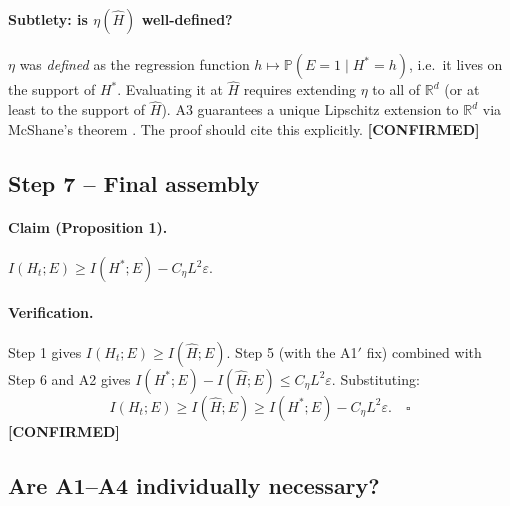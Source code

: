 \documentclass[11pt]{article}
\newcommand{\R}{\mathbb{R}}
\newcommand{\PP}{\mathbb{P}}
\newcommand{\CONF}{{\color{black!60!green}\textbf{[CONFIRMED]}}}
\begin{document}
\paragraph{Subtlety: is $\eta(\hat H)$ well-defined?}
$\eta$ was \emph{defined} as the regression function $h\mapsto\PP(E=1\mid
H^*=h)$, i.e.\ it lives on the support of $H^*$. Evaluating it at $\hat H$
requires extending $\eta$ to all of $\R^d$ (or at least to the support
of $\hat H$). A3 guarantees a unique Lipschitz extension to $\R^d$ via
McShane's theorem \citep{McShane1934}. The proof should cite this
explicitly. \CONF

\subsection{Step 7 -- Final assembly}

\paragraph{Claim (Proposition 1).}
$I(H_t;E)\ge I(H^*;E) - C_\eta L^2\varepsilon$.

\paragraph{Verification.}
Step 1 gives $I(H_t;E)\ge I(\hat H;E)$. Step 5 (with the A1$'$ fix)
combined with Step 6 and A2 gives
$I(H^*;E)-I(\hat H;E)\le C_\eta L^2\varepsilon$. Substituting:
\[
I(H_t;E)\ge I(\hat H;E)\ge I(H^*;E)-C_\eta L^2\varepsilon. \quad\square
\]
\CONF

\subsection{Are A1--A4 individually necessary?}
\end{document}
